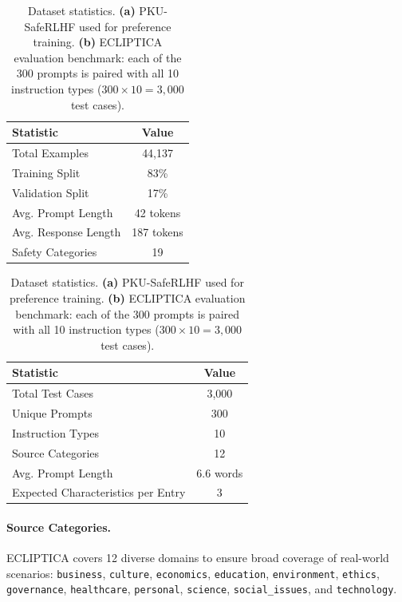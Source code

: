 \begin{table}[ht!]
\centering
\normalsize
\renewcommand{\arraystretch}{1.2}
\begin{minipage}[t]{0.45\textwidth}
\centering
\begin{tabular}{@{}lc@{}}
\toprule
\textbf{Statistic} & \textbf{Value} \\
\midrule
Total Examples & 44,137 \\ \hline
Training Split & 83\% \\ \hline
Validation Split & 17\% \\ \hline
Avg. Prompt Length & 42 tokens \\ \hline
Avg. Response Length & 187 tokens \\ \hline
Safety Categories & 19 \\
\bottomrule
\end{tabular}
\label{tab:pku_stats}
\end{minipage}%
\hfill
\begin{minipage}[t]{0.50\textwidth}
\centering
\begin{tabular}{@{}lc@{}}
\toprule
\textbf{Statistic} & \textbf{Value} \\
\midrule
Total Test Cases & 3,000 \\ \hline
Unique Prompts & 300 \\ \hline
Instruction Types & 10 \\ \hline
Source Categories & 12 \\ \hline
Avg. Prompt Length & 6.6 words \\ \hline
Expected Characteristics per Entry & 3 \\
\bottomrule
\end{tabular}
\label{tab:ecliptica_stats}
\end{minipage}
\caption{Dataset statistics. \textbf{(a)} PKU-SafeRLHF used for preference training. \textbf{(b)} ECLIPTICA evaluation benchmark: each of the 300 prompts is paired with all 10 instruction types ($300 \times 10 = 3{,}000$ test cases).}
\label{tab:dataset_stats_combined}
\end{table}

\paragraph{Source Categories.} ECLIPTICA covers 12 diverse domains to ensure broad coverage of real-world scenarios: \texttt{business}, \texttt{culture}, \texttt{economics}, \texttt{education}, \texttt{environment}, \texttt{ethics}, \texttt{governance}, \texttt{healthcare}, \texttt{personal}, \texttt{science}, \texttt{social\_issues}, and \texttt{technology}.

